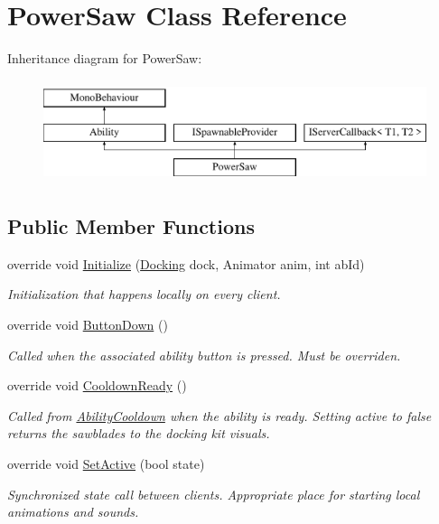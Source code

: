 \hypertarget{class_power_saw}{}\section{Power\+Saw Class Reference}
\label{class_power_saw}
Inheritance diagram for Power\+Saw\+:\begin{figure}[H]
\begin{center}
\leavevmode
\includegraphics[height=3.000000cm]{class_power_saw}
\end{center}
\end{figure}
\subsection*{Public Member Functions}
\begin{DoxyCompactItemize}
\item 
override void \hyperlink{class_power_saw_ac695198ffe590b908e1c0c85f63fb792}{Initialize} (\hyperlink{class_docking}{Docking} dock, Animator anim, int ab\+Id)
\begin{DoxyCompactList}\small\item\em Initialization that happens locally on every client. \end{DoxyCompactList}\item 
override void \hyperlink{class_power_saw_a7709f4f49760b8052c45648a1a13ee83}{Button\+Down} ()
\begin{DoxyCompactList}\small\item\em Called when the associated ability button is pressed. Must be overriden. \end{DoxyCompactList}\item 
override void \hyperlink{class_power_saw_af94a6750bc9f283d35c967f38717084d}{Cooldown\+Ready} ()
\begin{DoxyCompactList}\small\item\em Called from \hyperlink{class_ability_cooldown}{Ability\+Cooldown} when the ability is ready. Setting active to false returns the sawblades to the docking kit visuals. \end{DoxyCompactList}\item 
override void \hyperlink{class_power_saw_ae83e556ce348e2fe51eb96f42f84c524}{Set\+Active} (bool state)
\begin{DoxyCompactList}\small\item\em Synchronized state call between clients. Appropriate place for starting local animations and sounds. \end{DoxyCompactList}\end{DoxyCompactItemize}

